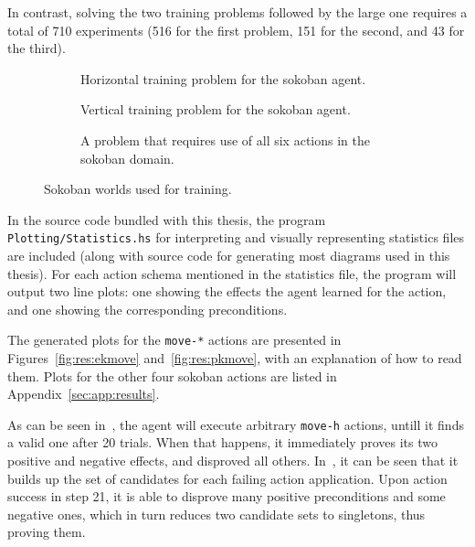 \documentclass[../Master.tex]{subfiles}
\begin{document}
In contrast, solving the two training problems followed by the large one requires a total of 710 experiments (516 for the first problem, 151 for the second, and 43 for the third).

\begin{figure}
    \begin{subfigure}{0.3\textwidth}
        \resizebox{\linewidth}{!}{}
        \caption{Horizontal training problem for the sokoban agent.}\label{fig:results:train1}
    \end{subfigure}
    \begin{subfigure}{0.3\textwidth}
        \resizebox{\linewidth}{!}{}
        \caption{Vertical training problem for the sokoban agent.}\label{fig:results:train2}
    \end{subfigure}
    \begin{subfigure}{0.3\textwidth}
        \resizebox{\linewidth}{!}{}
        \caption{A problem that requires use of all six actions in the sokoban domain.}\label{fig:results:train3}
    \end{subfigure}
    \caption{Sokoban worlds used for training.}\label{fig:results:sokoTraining}
\end{figure}

In the source code bundled with this thesis, the program \texttt{Plotting/Statistics.hs} for interpreting and visually representing statistics files are included  (along with source code for generating most diagrams used in this thesis). For each action schema mentioned in the statistics file, the program will output two line plots: one showing the effects the agent learned for the action, and one showing the corresponding preconditions.

The generated plots for the \texttt{move-*} actions are presented in Figures~\ref{fig:res:ekmove} and~\ref{fig:res:pkmove}, with an explanation of how to read them. Plots for the other four sokoban actions are listed in Appendix~\ref{sec:app:results}.

As can be seen in~, the agent will execute arbitrary \texttt{move-h} actions, untill it finds a valid one after 20 trials. When that happens, it immediately proves its two positive and negative effects, and disproved all others. In~, it can be seen that it builds up the set of candidates for each failing action application. Upon action success in step 21, it is able to disprove many positive preconditions and some negative ones, which in turn reduces two candidate sets to singletons, thus proving them.
\end{document}
